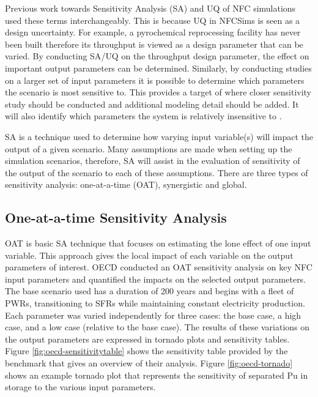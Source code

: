 Previous work towards Sensitivity Analysis (SA) and \gls{UQ} of 
\gls{NFC} simulations used these terms interchangeably. 
This is because \gls{UQ} in \glspl{NFCSim} is seen as a design 
uncertainty. 
For example, a pyrochemical reprocessing facility has never been 
built therefore its throughput is viewed as a design parameter 
that can be varied. 
By conducting \gls{SA}/\gls{UQ} on the throughput design 
parameter, the effect on important output parameters can be 
determined. 
Similarly, by conducting studies on a larger set of input 
parameters it is possible to determine which parameters the 
scenario is most sensitive to.
This provides a target of where closer sensitivity study 
should be conducted and additional modeling detail should be added. 
It will also identify which parameters the system is relatively 
insensitive to \cite{noauthor_effects_2017}. 

\gls{SA} is a technique used to determine how 
varying input variable(s) will impact the 
output of a given scenario. 
Many assumptions are made when setting up the simulation scenarios, 
therefore, \gls{SA} will assist in the evaluation of
sensitivity of the output of the scenario to each of these 
assumptions.  
There are three types of sensitivity analysis: one-at-a-time (OAT), 
synergistic and global. 

\subsection{One-at-a-time Sensitivity Analysis}
OAT is basic \gls{SA} technique that focuses on estimating 
the lone effect of one input variable. 
This approach gives the local impact of each variable on the 
output parameters of interest. 
OECD conducted an OAT sensitivity analysis \cite{noauthor_effects_2017} 
on key \gls{NFC} input parameters
and quantified the impacts on the selected output parameters. 
The base scenario used has a duration of 200 years and begins 
with a fleet of \glspl{PWR}, transitioning to \glspl{SFR} while 
maintaining constant electricity production. 
Each parameter was varied independently for three cases: 
the base case, a high case, and a low case (relative to the base 
case). 
The results of these variations on the output parameters 
are expressed in tornado plots and sensitivity tables. 
Figure \ref{fig:oecd-sensitivitytable} shows the sensitivity table
provided by the benchmark that gives an overview of their analysis. 
Figure \ref{fig:oecd-tornado} shows an example tornado plot that represents 
the sensitivity of separated Pu in storage to the various input parameters. 

